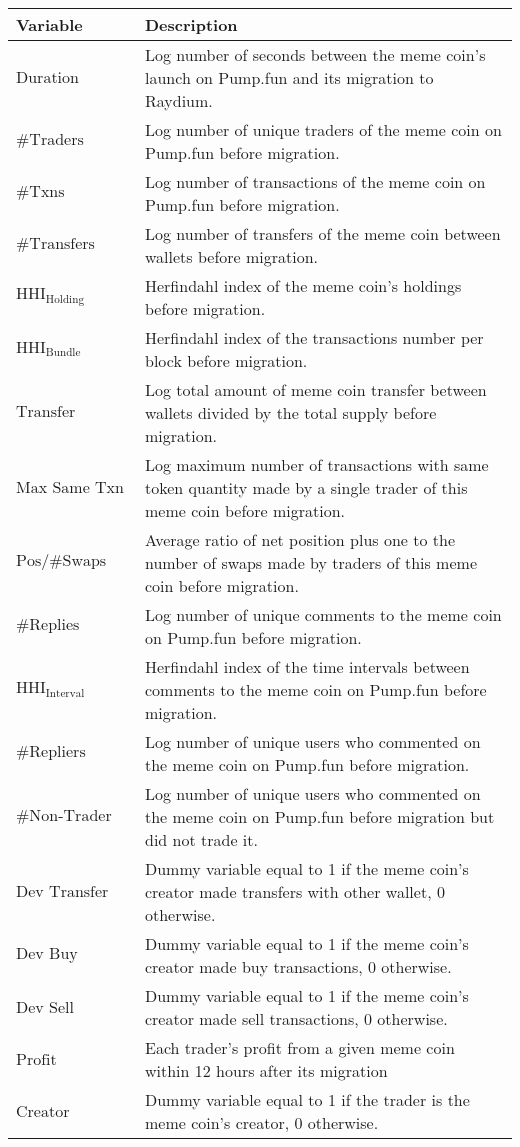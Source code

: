 \begin{tabularx}{\textwidth}{lX}\hline
Variable & Description \\
\hline
$\text{Duration}$ & Log number of seconds between the meme coin's launch on Pump.fun and its migration to Raydium. \\
$\#\text{Traders}$ & Log number of unique traders of the meme coin on Pump.fun before migration. \\
$\#\text{Txns}$ & Log number of transactions of the meme coin on Pump.fun before migration. \\
$\#\text{Transfers}$ & Log number of transfers of the meme coin between wallets before migration. \\
$\text{HHI}_{\text{Holding}}$ & Herfindahl index of the meme coin's holdings before migration. \\
$\text{HHI}_{\text{Bundle}}$ & Herfindahl index of the transactions number per block before migration. \\
$\text{Transfer Amount (\%)}$ & Log total amount of meme coin transfer between wallets divided by the total supply before migration. \\
$\text{Max Same Txn}$ & Log maximum number of transactions with same token quantity made by a single trader of this meme coin before migration. \\
$\text{Pos/\#Swaps}$ & Average ratio of net position plus one to the number of swaps made by traders of this meme coin before migration. \\
$\#\text{Replies}$ & Log number of unique comments to the meme coin on Pump.fun before migration. \\
$\text{HHI}_{\text{Interval}}$ & Herfindahl index of the time intervals between comments to the meme coin on Pump.fun before migration. \\
$\#\text{Repliers}$ & Log number of unique users who commented on the meme coin on Pump.fun before migration. \\
$\#\text{Non-Trader Repliers}$ & Log number of unique users who commented on the meme coin on Pump.fun before migration but did not trade it. \\
$\text{Dev Transfer}$ & Dummy variable equal to 1 if the meme coin's creator made transfers with other wallet, 0 otherwise. \\
$\text{Dev Buy}$ & Dummy variable equal to 1 if the meme coin's creator made buy transactions, 0 otherwise. \\
$\text{Dev Sell}$ & Dummy variable equal to 1 if the meme coin's creator made sell transactions, 0 otherwise. \\
$\text{Profit}$ & Each trader's profit from a given meme coin within 12 hours after its migration \\
$\text{Creator}$ & Dummy variable equal to 1 if the trader is the meme coin's creator, 0 otherwise. \\
\hline
\end{tabularx}
